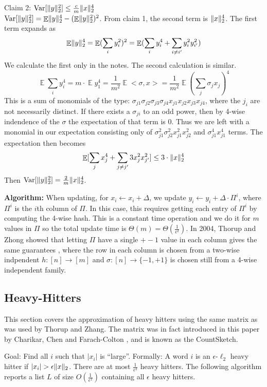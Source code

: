 \documentclass[11pt]{article}
\DeclareMathOperator*{\E}{\mathbb{E}}
\DeclarePairedDelimiter \norm {\|} {\|}
\newcommand{\Var}{\mathrm{Var}}
\begin{document}
Claim 2: $\Var [\norm{y}_{2}^{2}] \leq \frac{c}{m} \norm{x}_{2}^{4}$ \\
$\Var [\norm{y}_{2}^{2}] = \E\norm{y}_{2}^{4} - (\E \norm{y}_{2}^{2})^{2}$. From claim 1, the second term is $\norm{x}_{2}^{4}$. The first term expands as $$\E\norm{y}_{2}^{4} = \E (\sum_{i} y_{i}^{2})^{2} = \E (\sum_{i} y_{i}^{4} + \sum_{i \neq i'} y_{i}^{2} y_{i'}^{2})$$ We calculate the first only in the notes. The second calculation is similar. 
$$
\E \sum_{i} y_{i}^{4} = m \cdot \E y_{1}^4 = \frac{1}{m^{2}} \E <\sigma, x> = \frac{1}{m^{2}}\E (\sum_{j} \sigma_{j}x_{j})^4$$
This is a sum of monomials of the type: $\sigma_{j1}\sigma_{j2}\sigma_{j3}\sigma_{j4}x_{j1}x_{j2}x_{j3}x_{j4}$, where the $j_{i}$ are not necessarily distinct. If there exists a $\sigma_{ji}$ to an odd power, then by 4-wise indendence of the $\sigma$ the expectation of that term is 0. Thus we are left with a monomial in our expectation consisting only of $\sigma_{j1}^{2}\sigma_{j2}^{2}x_{j1}^{2}x_{j2}^{2}$ and $\sigma_{j1}^{4}x_{j1}^{4}$ terms. The expectation then becomes $$\E [\sum_{j} x_{j}^{4} + \sum_{j \neq j'} 3x_{j}^{2}x_{j'}^{2}] \leq 3 \cdot \norm{x}_{2}^{4}$$ Then $\Var[\norm{y}_{2}^{2}] = \frac{2}{m} \norm{x}_{2}^{4}$.

\textbf{Algorithm:} When updating, for $x_{i} \leftarrow x_{i} + \Delta$, we update $y_{i} \leftarrow y_{i} + \Delta \cdot \Pi^i$, where $\Pi^i$ is the $i$th column of $\Pi$. In this case, this requires getting each entry of $\Pi^i$ by computing the 4-wise hash. This is a constant time operation and we do it for $m$ values in $\Pi$ so the total update time is $\Theta(m) = \Theta(\frac{1}{\epsilon^{2}})$. In 2004, Thorup and Zhong showed that letting $\Pi$ have a single $+-1$ value in each column gives the same guarantees \cite{ThorupZ2004}, where the row in each column is chosen from a two-wise indpendent $h: [n] \rightarrow [m]$ and $\sigma: [n] \rightarrow \{-1,+1\}$ is chosen still from a 4-wise independent family. 

\subsection{Heavy-Hitters}

This section covers the approximation of heavy hitters using the same matrix as was used by Thorup and Zhang. The matrix was in fact introduced in this paper by Charikar, Chen and Farach-Colton \cite{Charikar2004}, and is known as the CountSketch.

Goal: Find all $i$ such that $|x_{i}|$ is ``large''. Formally: A word $i$ is an $\epsilon$-$\ell_{2}$ heavy hitter if $|x_{i}| > \epsilon \norm{x}_{2}$. There are at most $\frac{1}{\epsilon^{2}}$ heavy hitters. The following algorithm reports a list $L$ of size $O(\frac{1}{\epsilon^{2}})$ containing all $\epsilon$ heavy hitters. 
\end{document}
